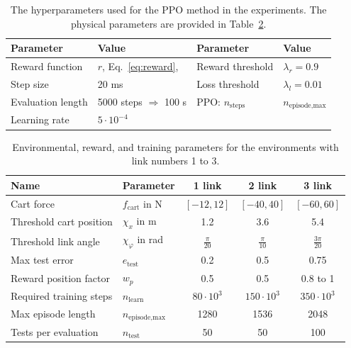 \begin{table}[h]
	\centering
	\caption{The hyperparameters used for the PPO method in the experiments. The physical parameters are provided in Table~\ref{tab:env_params}.}
	\label{tab:hyperparameters}
	\begin{tabular}{ll|ll}
		\toprule
		\textbf{Parameter}       & \textbf{Value} & \textbf{Parameter}       & \textbf{Value} \\ \midrule
		Reward function          & $r$, Eq.~\ref{eq:reward},  & Reward threshold         & $\lambda_r = 0.9$ \\ 
		Step size                & 20 ms           & Loss threshold           & $\lambda_l = 0.01$ \\ 
		Evaluation length        & 5000 steps $\Rightarrow$ 100 s & PPO: $n_{\text{steps}}$       & $n_{\text{episode,max}}$ \\ 
		Learning rate      & $5 \cdot 10^{-4}$ & & \\ \bottomrule
	\end{tabular}
\end{table}

\begin{table}[h]
	\centering
	\caption{Environmental, reward, and training parameters for the environments with link numbers 1 to 3.}
	\label{tab:env_params}
	\begin{tabular}{l l c c c}
		\toprule
		\textbf{Name} & \textbf{Parameter} & \textbf{1 link} & \textbf{2 link} & \textbf{3 link} \\ \midrule
		Cart force              & $f_{\text{cart}}$ in N         & \([-12, 12]\)   & \([-40, 40]\)   & \([-60, 60]\)  \\ 
		Threshold cart position & $\chi_x$ in m                 & 1.2  & 3.6  & 5.4 \\ 
		Threshold link angle    & $\chi_\varphi$ in rad         & $\frac{\pi}{20}$ & $\frac{\pi}{10}$ & $\frac{3\pi}{20}$ \\
		Max test error          & $e_{\text{test}}$             & 0.2  & 0.5  & 0.75 \\ 
		Reward position factor  & $w_p$                         & 0.5  & 0.5  & 0.8 to 1 \\ 
		Required training steps & $n_{\text{learn}}$            & $80 \cdot 10^3$ & $150 \cdot 10^3$ & $350 \cdot 10^3$ \\ 
		Max episode length      & $n_{\text{episode,max}}$      & 1280 & 1536 & 2048 \\ 
		Tests per evaluation    & $n_{\text{test}}$             & 50   & 50   & 100 \\ 
		\bottomrule
	\end{tabular}
\end{table}

